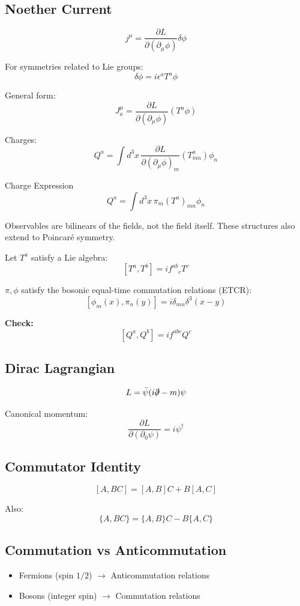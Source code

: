 \documentclass[14pt]{article} %
\begin{document}
\subsection*{Noether Current}
\[
j^\mu = \frac{\partial L}{\partial (\partial_\mu \phi)} \delta \phi
\]

For symmetries related to Lie groups:
\[
\delta \phi = i \epsilon^a T^a \phi
\]

General form:
\[
J^\mu_a = \frac{\partial L}{\partial (\partial_\mu \phi)} (T^a \phi)
\]

Charges:
\[
Q^a = \int d^3x \, \frac{\partial L}{\partial (\partial_\mu \phi)_m} (T^a_{mn}) \phi_n
\]

Charge Expression
\[
Q^a = \int d^3x \, \pi_m (T^a)_{mn}\phi_n
\]

Observables are bilinears of the fields, not the field itself.  
These structures also extend to Poincaré symmetry.  

Let $T^a$ satisfy a Lie algebra:
\[
[T^a, T^b] = i f^{ab}{}_c T^c
\]

$\pi, \phi$ satisfy the bosonic equal-time commutation relations (ETCR):
\[
[\phi_m(x), \pi_n(y)] = i \delta_{mn}\delta^3(x-y)
\]

\begin{tcolorbox}
\textbf{Check:}
\[
[Q^a, Q^b] = i f^{abc} Q^c
\]
\end{tcolorbox}

\subsection*{Dirac Lagrangian}
\[
L = \bar{\psi} (i \slashed{\partial} - m)\psi
\]

Canonical momentum:
\[
\frac{\partial L}{\partial (\partial_0 \psi)} = i \psi^\dagger
\]

\subsection*{Commutator Identity}
\[
[A, BC] = [A,B]C + B[A,C]
\]

Also:
\[
\{A,BC\} = \{A,B\}C - B\{A,C\}
\]

\subsection*{Commutation vs Anticommutation}

\begin{itemize}
  \item Fermions (spin $1/2$) $\rightarrow$ Anticommutation relations
  \item Bosons (integer spin) $\rightarrow$ Commutation relations
\end{itemize}
\end{document}

